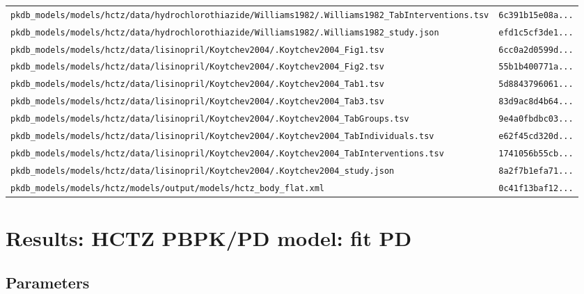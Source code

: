 \documentclass{article}
\begin{document}
\begin{longtable}{ll}
\texttt{pkdb\_models/models/hctz/data/hydrochlorothiazide/Williams1982/.Williams1982\_TabInterventions.tsv} & \texttt{6c391b15e08a...} \\
\texttt{pkdb\_models/models/hctz/data/hydrochlorothiazide/Williams1982/.Williams1982\_study.json} & \texttt{efd1c5cf3de1...} \\
\texttt{pkdb\_models/models/hctz/data/lisinopril/Koytchev2004/.Koytchev2004\_Fig1.tsv} & \texttt{6cc0a2d0599d...} \\
\texttt{pkdb\_models/models/hctz/data/lisinopril/Koytchev2004/.Koytchev2004\_Fig2.tsv} & \texttt{55b1b400771a...} \\
\texttt{pkdb\_models/models/hctz/data/lisinopril/Koytchev2004/.Koytchev2004\_Tab1.tsv} & \texttt{5d8843796061...} \\
\texttt{pkdb\_models/models/hctz/data/lisinopril/Koytchev2004/.Koytchev2004\_Tab3.tsv} & \texttt{83d9ac8d4b64...} \\
\texttt{pkdb\_models/models/hctz/data/lisinopril/Koytchev2004/.Koytchev2004\_TabGroups.tsv} & \texttt{9e4a0fbdbc03...} \\
\texttt{pkdb\_models/models/hctz/data/lisinopril/Koytchev2004/.Koytchev2004\_TabIndividuals.tsv} & \texttt{e62f45cd320d...} \\
\texttt{pkdb\_models/models/hctz/data/lisinopril/Koytchev2004/.Koytchev2004\_TabInterventions.tsv} & \texttt{1741056b55cb...} \\
\texttt{pkdb\_models/models/hctz/data/lisinopril/Koytchev2004/.Koytchev2004\_study.json} & \texttt{8a2f7b1efa71...} \\
\texttt{pkdb\_models/models/hctz/models/output/models/hctz\_body\_flat.xml} & \texttt{0c41f13baf12...} \\
\end{longtable}

\section{Results: HCTZ PBPK/PD model: fit PD}

\subsection{Parameters}
\end{document}
